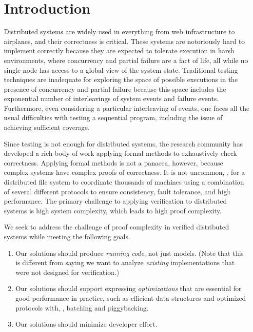 \chapter{Introduction}
\label{chap:intro}

Distributed systems are widely used
  in everything from web infrastructure to airplanes,
  and their correctness is critical.
These systems are notoriously hard to implement correctly
  because they are expected to tolerate execution in harsh environments,
  where concurrency and partial failure are a fact of life,
  all while no single node has access to a global view of the system state.
Traditional testing techniques are inadequate
  for exploring the space of possible executions
  in the presence of concurrency and partial failure
  because this space includes the exponential number of
  interleavings of system events and failure events.
Furthermore, even considering a particular interleaving of events,
  one faces all the usual difficulties with testing a sequential program,
  including the issue of achieving sufficient coverage.

Since testing is not enough for distributed systems,
  the research community has developed
  a rich body of work applying formal methods
  to exhaustively check correctness.
Applying formal methods is not a panacea, however,
  because complex systems have complex proofs of correctness.
It is not uncommon, \eg,
  for a  distributed file system to coordinate thousands of machines
  using a combination of several different protocols to ensure
  consistency, fault tolerance, and high performance.
The primary challenge to applying verification to distributed systems is
  high system complexity, which leads to high proof complexity.

We seek to address the challenge of proof complexity in verified distributed systems
  while meeting the following goals.
\begin{enumerate}
\item Our solutions should produce \emph{running code}, not just models.
  (Note that this is different from saying
     we want to analyze \emph{existing} implementations
     that were not designed for verification.)
\item Our solutions should support expressing \emph{optimizations}
    that are essential for good performance in practice,
    such as efficient data structures
      and optimized protocols with, \eg, batching and piggybacking.
\item Our solutions should minimize developer effort.
\end{enumerate}

